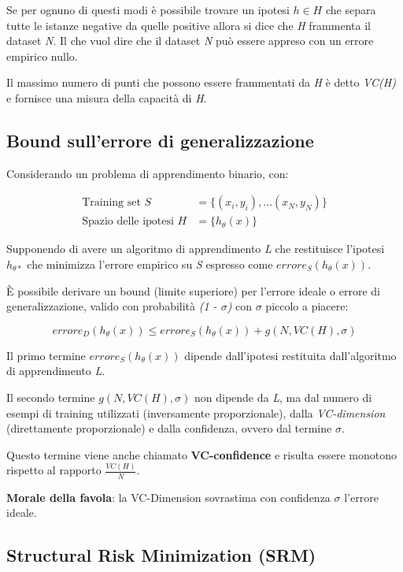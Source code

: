 Se per ognuno di questi modi è possibile trovare un ipotesi $h \in H$
che separa tutte le istanze negative da quelle positive allora si dice
che \emph{H} frammenta il dataset \emph{N}. 
Il che vuol dire che il dataset \emph{N} può essere appreso con un errore empirico nullo.

Il massimo numero di punti che possono essere frammentati da \emph{H} è
detto \emph{VC(H)} e fornisce una misura della capacità di \emph{H}.

\subsection{Bound sull'errore di generalizzazione}\label{sec:vcc}

Considerando un problema di apprendimento binario, con:

\begin{align*}
\text{Training set }S &= \{(x_i,y_i), \ldots (x_N, y_N)\} \\
\text{Spazio delle ipotesi } H &=\{h_\theta(x)\} 
\end{align*}

Supponendo di avere un algoritmo di apprendimento \emph{L} che
restituisce l'ipotesi $h_{\theta*}$ che minimizza l'errore empirico su
\emph{S} espresso come $errore_S(h_\theta(x))$.

È possibile derivare un bound (limite superiore) per l'errore ideale o
errore di generalizzazione, valido con probabilità \emph{(1 - $\sigma$)} con
$\sigma$ piccolo a piacere:

$$
errore_D(h_\theta(x)) \leq  errore_S(h_{\theta}(x)) + g(N, VC(H), \sigma)
$$

Il primo termine $errore_S(h_{\theta}(x))$ dipende dall'ipotesi restituita
dall'algoritmo di apprendimento \textit{L}.

Il secondo termine $g(N, VC(H), \sigma)$ non dipende da \emph{L}, ma dal
numero di esempi di training utilizzati (inversamente proporzionale),
dalla \emph{VC-dimension} (direttamente proporzionale) e dalla
confidenza, ovvero dal termine $\sigma$.

Questo termine viene anche chiamato \textbf{VC-confidence} e risulta essere monotono rispetto al rapporto
$\frac{VC(H)}{N}$.

\textbf{Morale della favola}: la VC-Dimension sovrastima con confidenza $\sigma$ l'errore ideale.

\subsection{Structural Risk Minimization (SRM)}\label{sec:srm}

